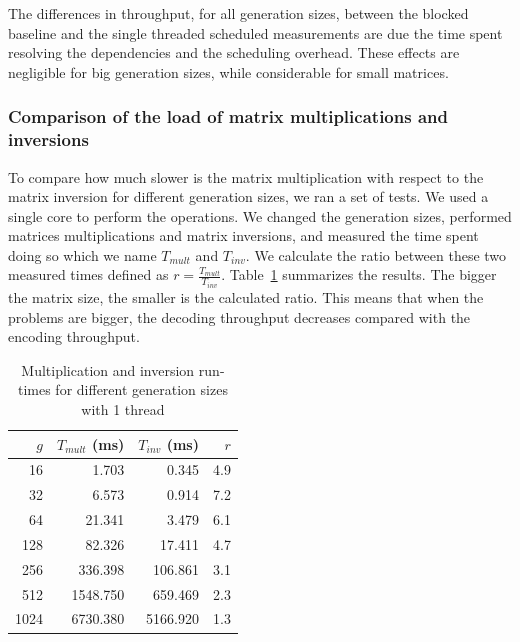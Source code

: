 The differences in throughput, for all generation sizes, between the
blocked baseline and the single threaded scheduled measurements are due the
time spent resolving the dependencies and the scheduling overhead. These
effects are negligible for big generation sizes, while considerable for
small matrices.

\subsubsection{Comparison of the load of matrix multiplications and inversions}

To compare how much slower is the matrix multiplication with respect to the
matrix inversion for different generation sizes, we ran a set of tests. We used
a single core to perform the operations. We changed the generation sizes,
performed matrices multiplications and matrix inversions, and measured the time
spent doing so which we name $T_{mult}$ and $T_{inv}$. We calculate the ratio
between these two measured times defined as $r = \frac{T_{mult}}{T_{inv}}$.
Table~\ref{runtimes} summarizes the results. The bigger the matrix size, the
smaller is the calculated ratio. This means that when the problems are bigger,
the decoding throughput decreases compared with the encoding throughput.

\begin{table}[H]
\center
\caption{Multiplication and inversion run-times for different generation sizes with 1 thread}
\begin{tabular}{|r|r|r|r|}

\hline
$g$ & $T_{mult}$ (ms) & $T_{inv}$ (ms) &$r$ \\
\hline
\hline

	16   & 1.703     & 0.345    & 4.9 \\
\hline
	32   & 6.573     & 0.914    & 7.2 \\
\hline
	64   & 21.341    & 3.479    & 6.1 \\
\hline
	128  & 82.326    & 17.411   & 4.7 \\
\hline
	256  & 336.398   & 106.861  & 3.1 \\
\hline
	512  & 1548.750  & 659.469  & 2.3 \\
\hline
	1024 & 6730.380  & 5166.920 & 1.3 \\
\hline
\end{tabular}
\vspace{0.2cm}
\label{runtimes}
\end{table}
